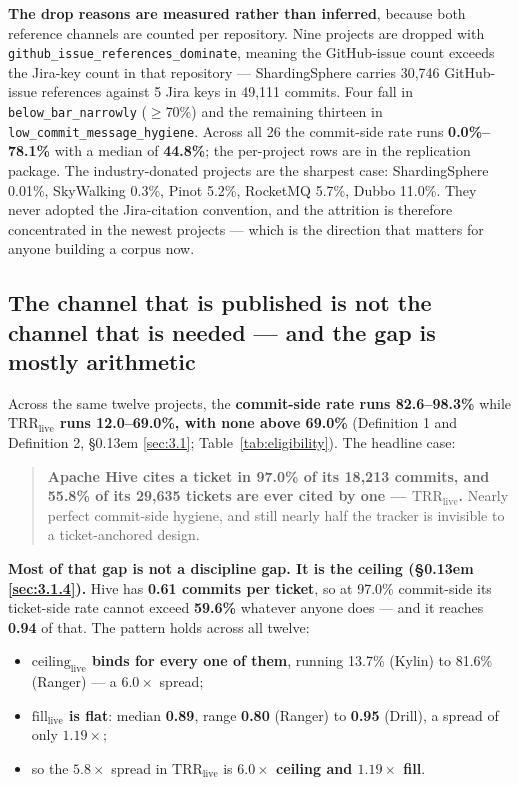 \documentclass[conference]{IEEEtran}
\begin{document}
\textbf{The drop reasons are measured rather than inferred}, because both reference channels are counted per repository. Nine projects are dropped with \texttt{github\_\allowbreak{}issue\_\allowbreak{}references\_\allowbreak{}dominate}, meaning the GitHub-issue count exceeds the Jira-key count in that repository --- ShardingSphere carries 30,746 GitHub-issue references against 5 Jira keys in 49,111 commits. Four fall in \texttt{below\_\allowbreak{}bar\_\allowbreak{}narrowly} ($\geq$70\%) and the remaining thirteen in \texttt{low\_\allowbreak{}commit\_\allowbreak{}message\_\allowbreak{}hygiene}. Across all 26 the commit-side rate runs \textbf{0.0\%--78.1\%} with a median of \textbf{44.8\%}; the per-project rows are in the replication package. The industry-donated projects are the sharpest case: ShardingSphere 0.01\%, SkyWalking 0.3\%, Pinot 5.2\%, RocketMQ 5.7\%, Dubbo 11.0\%. They never adopted the Jira-citation convention, and the attrition is therefore concentrated in the newest projects --- which is the direction that matters for anyone building a corpus now.

\subsection{The channel that is published is not the channel that is needed --- and the gap is mostly arithmetic}
\label{sec:4.2}

Across the same twelve projects, the \textbf{commit-side rate runs 82.6--98.3\%} while \textbf{$\mathrm{TRR}_\mathrm{live}$ runs 12.0--69.0\%, with none above 69.0\%} (Definition 1 and Definition 2, \S\kern0.13em \ref{sec:3.1}; Table~\ref{tab:eligibility}). The headline case:

\begin{quote}
\textbf{Apache Hive cites a ticket in 97.0\% of its 18,213 commits, and 55.8\% of its 29,635 tickets are ever cited by one --- $\mathrm{TRR}_\mathrm{live}$.} Nearly perfect commit-side hygiene, and still nearly half the tracker is invisible to a ticket-anchored design.

\end{quote}

\textbf{Most of that gap is not a discipline gap. It is the ceiling (\S\kern0.13em \ref{sec:3.1.4}).} Hive has \textbf{0.61 commits per ticket}, so at 97.0\% commit-side its ticket-side rate cannot exceed \textbf{59.6\%} whatever anyone does --- and it reaches \textbf{0.94} of that. The pattern holds across all twelve:

\begin{itemize}
\item \textbf{$\mathrm{ceiling}_\mathrm{live}$ binds for every one of them}, running 13.7\% (Kylin) to 81.6\% (Ranger) --- a $6.0\times$ spread;
\item \textbf{$\mathrm{fill}_\mathrm{live}$ is flat}: median \textbf{0.89}, range \textbf{0.80} (Ranger) to \textbf{0.95} (Drill), a spread of only \textbf{$1.19\times$};
\item so the $5.8\times$ spread in $\mathrm{TRR}_\mathrm{live}$ is \textbf{$6.0\times$ ceiling and $1.19\times$ fill}.
\end{itemize}
\end{document}
